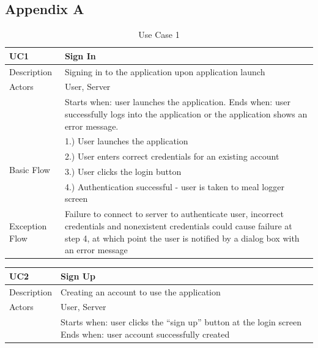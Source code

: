 \documentclass{article}
\begin{document}
\newpage
\begin{appendicies}
\section{Appendix A}
\begin{table}[!htbp]
\centering
\hspace*{-0.5cm}
\begin{tabular}{||m{6cm}|m{6cm}||}
    \hline
    UC1 & Sign In\\
    \hline
    Description & Signing in to the application upon application launch\\
    \hline
    Actors & User, Server\\
    \hline
    & Starts when: user launches the application. \newline
    Ends when: user successfully logs into the application or the application shows an error message.\\
    \hline
    \multirow{4}{\hsize}{Basic Flow} 
                                    & 1.) User launches the application\\
                                    & 2.) User  enters  correct  credentials  for an existing account\\ 
                                    & 3.) User clicks the login button\\
                                    & 4.) Authentication successful - user is taken to meal logger screen\\
    \hline
    Exception Flow & Failure to connect to server to authenticate user, incorrect credentials and nonexistent credentials could cause failure at step 4, at which point the user is notified by a dialog box with an error message\\
\hline
\end{tabular}
\caption{Use Case 1}
\label{table:UC1}
\end{table}
\begin{table}[!htbp]
\centering
\hspace*{-0.5cm}
\begin{tabular}{||m{6cm}|m{6cm}||}
    \hline
    UC2 & Sign Up\\
    \hline
    Description & Creating an account to use the application\\
    \hline
    Actors & User, Server\\
    \hline
    & Starts when: user clicks the “sign up” button at the login screen \newline
    Ends when: user account successfully created\\

\end{tabular}
\end{table}
\end{appendicies}
\end{document}
